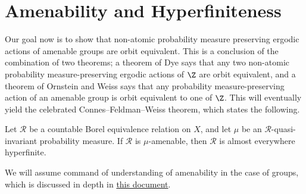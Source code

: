 \documentclass[10pt]{mypackage}
\begin{document}
\section{Amenability and Hyperfiniteness}%
Our goal now is to show that non-atomic probability measure preserving ergodic actions of amenable groups are orbit equivalent. This is a conclusion of the combination of two theorems; a theorem of Dye says that any two non-atomic probability measure-preserving ergodic actions of $\Z$ are orbit equivalent, and a theorem of Ornstein and Weiss says that any probability measure-preserving action of an amenable group is orbit equivalent to one of $\Z$. This will eventually yield the celebrated Connes--Feldman--Weiss theorem, which states the following.
\begin{theorem}
  Let $\mathcal{R}$ be a countable Borel equivalence relation on $X$, and let $\mu$ be an $\mathcal{R}$-quasi-invariant probability measure. If $\mathcal{R}$ is $\mu$-amenable, then $\mathcal{R}$ is almost everywhere hyperfinite.
\end{theorem}
We will assume command of understanding of amenability in the case of groups, which is discussed in depth in \href{https://ai.avinash-iyer.com/Classes_and_Homework/College/Y4/Honors\%20Thesis/Amenability\%20Text/amenability.pdf}{this document}.
\end{document}
